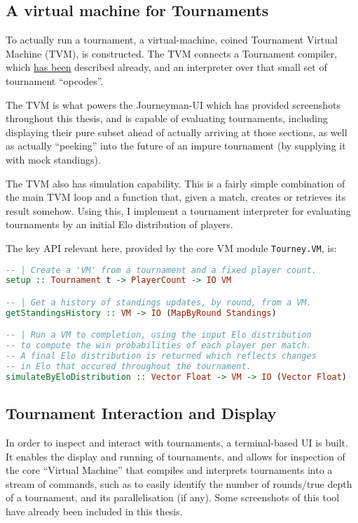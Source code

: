 \documentclass[a4,11pt,twoside,final,hidelinks]{article}
\begin{document}
\subsection{A virtual machine for Tournaments}
\label{sec:org2515d74}

To actually run a tournament, a virtual-machine, coined Tournament Virtual
Machine (TVM), is constructed. The TVM connects a Tournament compiler, which \hyperref[compiler]{has
been} described already, and an interpreter over that small set of tournament
``opcodes''.

The TVM is what powers the Journeyman-UI which has provided screenshots
throughout this thesis, and is capable of evaluating tournaments, including
displaying their pure subset ahead of actually arriving at those sections, as
well as actually ``peeking'' into the future of an impure tournament (by supplying
it with mock standings).

The TVM also has simulation capability. This is a fairly simple combination of
the main TVM loop and a function that, given a match, creates or retrieves its
result somehow. Using this, I implement a tournament interpreter for evaluating
tournaments by an initial Elo distribution of players.

The key API relevant here, provided by the core VM module \texttt{Tourney.VM}, is:

\newpage

\begin{lstlisting}[language=haskell,numbers=none]
-- | Create a 'VM' from a tournament and a fixed player count.
setup :: Tournament t -> PlayerCount -> IO VM

-- | Get a history of standings updates, by round, from a VM.
getStandingsHistory :: VM -> IO (MapByRound Standings)

-- | Run a VM to completion, using the input Elo distribution
-- to compute the win probabilities of each player per match.
-- A final Elo distribution is returned which reflects changes
-- in Elo that occured throughout the tournament.
simulateByEloDistribution :: Vector Float -> VM -> IO (Vector Float)
\end{lstlisting}

\subsection{Tournament Interaction and Display}
\label{sec:org66523de}

In order to inspect and interact with tournaments, a terminal-based UI is built.
It enables the display and running of tournaments, and allows for inspection of
the core ``Virtual Machine'' that compiles and interprets tournaments into a
stream of commands, such as to easily identify the number of rounds/true depth
of a tournament, and its parallelisation (if any). Some screenshots of this tool
have already been included in this thesis.
\end{document}

